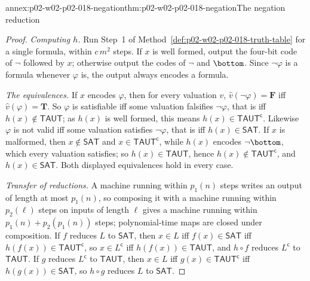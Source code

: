 \begin{annexitem}{annex:p02-w02-p02-018-negation}{thm:p02-w02-p02-018-negation}{The negation reduction}
\begin{proof}
\emph{Computing \(h\).}  Run Step~1 of
Method~\ref{def:p02-w02-p02-018-truth-table} for a single formula, within
\(c\,m^2\) steps.  If \(x\) is well formed, output the four-bit code of
\(\neg\) followed by \(x\); otherwise output the codes of \(\neg\) and
\(\bottom\).  Since \(\neg\varphi\) is a formula whenever \(\varphi\) is, the
output always encodes a formula.

\emph{The equivalences.}  If \(x\) encodes \(\varphi\), then for every
valuation \(v\), \(\widehat v(\neg\varphi)=\mathbf F\) iff
\(\widehat v(\varphi)=\mathbf T\).  So \(\varphi\) is satisfiable iff some
valuation falsifies \(\neg\varphi\), that is iff \(h(x)\notin\mathsf{TAUT}\);
as \(h(x)\) is well formed, this means \(h(x)\in\mathsf{TAUT}^{\mathsf c}\).
Likewise \(\varphi\) is not valid iff some valuation satisfies
\(\neg\varphi\), that is iff \(h(x)\in\mathsf{SAT}\).  If \(x\) is malformed,
then \(x\notin\mathsf{SAT}\) and \(x\in\mathsf{TAUT}^{\mathsf c}\), while
\(h(x)\) encodes \(\neg\bottom\), which every valuation satisfies; so
\(h(x)\in\mathsf{TAUT}\), hence \(h(x)\notin\mathsf{TAUT}^{\mathsf c}\), and
\(h(x)\in\mathsf{SAT}\).  Both displayed equivalences hold in every case.

\emph{Transfer of reductions.}  A machine running within \(p_1(n)\) steps
writes an output of length at most \(p_1(n)\), so composing it with a machine
running within \(p_2(\ell)\) steps on inputs of length \(\ell\) gives a
machine running within \(p_1(n)+p_2(p_1(n))\) steps; polynomial-time maps
are closed under composition.  If \(f\) reduces \(L\) to \(\mathsf{SAT}\),
then \(x\in L\) iff \(f(x)\in\mathsf{SAT}\) iff
\(h(f(x))\in\mathsf{TAUT}^{\mathsf c}\), so \(x\in L^{\mathsf c}\) iff
\(h(f(x))\in\mathsf{TAUT}\), and \(h\circ f\) reduces \(L^{\mathsf c}\) to
\(\mathsf{TAUT}\).  If \(g\) reduces \(L^{\mathsf c}\) to \(\mathsf{TAUT}\),
then \(x\in L\) iff \(g(x)\in\mathsf{TAUT}^{\mathsf c}\) iff
\(h(g(x))\in\mathsf{SAT}\), so \(h\circ g\) reduces \(L\) to
\(\mathsf{SAT}\).
\end{proof}
\end{annexitem}

